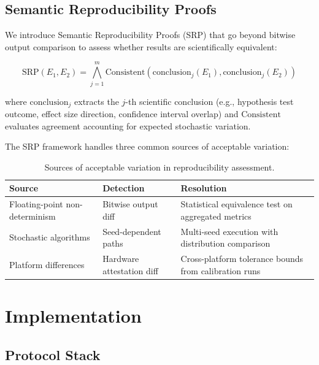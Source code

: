 \documentclass[11pt,a4paper]{article}
\begin{document}
\subsection{Semantic Reproducibility Proofs}

We introduce Semantic Reproducibility Proofs (SRP) that go beyond bitwise output comparison to assess whether results are scientifically equivalent:

\begin{equation}
    \text{SRP}(E_1, E_2) = \bigwedge_{j=1}^{m} \text{Consistent}(\text{conclusion}_j(E_1), \text{conclusion}_j(E_2))
\end{equation}

\noindent where $\text{conclusion}_j$ extracts the $j$-th scientific conclusion (e.g., hypothesis test outcome, effect size direction, confidence interval overlap) and $\text{Consistent}$ evaluates agreement accounting for expected stochastic variation.

The SRP framework handles three common sources of acceptable variation:

\begin{table}[H]
\centering
\caption{Sources of acceptable variation in reproducibility assessment.}
\label{tab:variation}
\begin{tabularx}{\textwidth}{@{}llX@{}}
\toprule
\textbf{Source} & \textbf{Detection} & \textbf{Resolution} \\
\midrule
Floating-point non-determinism & Bitwise output diff & Statistical equivalence test on aggregated metrics \\
Stochastic algorithms & Seed-dependent paths & Multi-seed execution with distribution comparison \\
Platform differences & Hardware attestation diff & Cross-platform tolerance bounds from calibration runs \\
\bottomrule
\end{tabularx}
\end{table}

\section{Implementation}
\label{sec:implementation}

\subsection{Protocol Stack}
\end{document}
